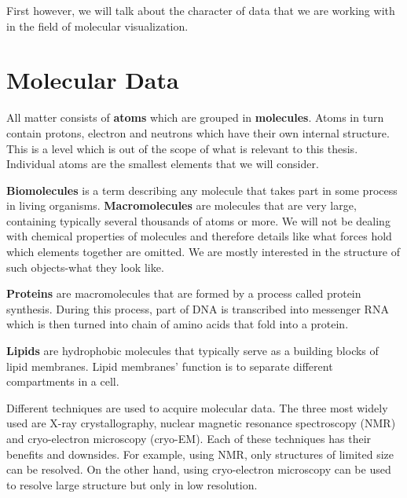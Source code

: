 \documentclass[
  digital, %
  table,   %
  nolof,     %
  nolot,     %
]{fithesis3}
\begin{document}
First however, we will talk about the character of data that we are working with in the field of molecular visualization.


\section{Molecular Data}
All matter consists of \textbf{atoms} which are grouped in \textbf{molecules}. Atoms in turn contain protons, electron and neutrons which have their own internal structure. This is a level which is out of the scope of what is relevant to this thesis. Individual atoms are the smallest elements that we will consider.

\textbf{Biomolecules} is a term describing any molecule that takes part in some process in living organisms. \textbf{Macromolecules} are molecules that are very large, containing typically several thousands of atoms or more. We will not be dealing with chemical properties of molecules and therefore details like what forces hold which elements together are omitted. We are mostly interested in the structure of such objects-what they look like.

\textbf{Proteins} are macromolecules that are formed by a process called protein synthesis. During this process, part of DNA is transcribed into messenger RNA which is then turned into chain of amino acids that fold into a protein.

\textbf{Lipids} are hydrophobic molecules that typically serve as a building blocks of lipid membranes. Lipid membranes' function is to separate different compartments in a cell.

Different techniques are used to acquire molecular data. The three most widely used are X-ray crystallography, nuclear magnetic resonance spectroscopy (NMR) and cryo-electron microscopy (cryo-EM). Each of these techniques has their benefits and downsides. For example, using NMR, only structures of limited size can be resolved. On the other hand, using cryo-electron microscopy can be used to resolve large structure but only in low resolution.
\end{document}
